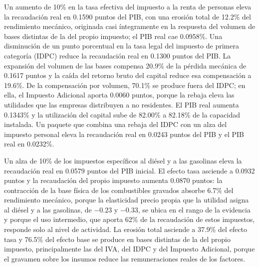 \documentclass[11pt]{article}
\begin{document}
Un aumento de 10\% en la tasa efectiva del impuesto a la renta de personas eleva la recaudación real en 0.1590 puntos del PIB, con una erosión total de 12.2\% del rendimiento mecánico, originada casi íntegramente en la respuesta del volumen de bases distintas de la del propio impuesto; el PIB real cae 0.0958\%. Una disminución de un punto porcentual en la tasa legal del impuesto de primera categoría (IDPC) reduce la recaudación real en 0.1300 puntos del PIB. La expansión del volumen de las bases compensa 20.9\% de la pérdida mecánica de 0.1617 puntos y la caída del retorno bruto del capital reduce esa compensación a 19.6\%. De la compensación por volumen, 70.1\% se produce fuera del IDPC; en ella, el Impuesto Adicional aporta 0.0060 puntos, porque la rebaja eleva las utilidades que las empresas distribuyen a no residentes. El PIB real aumenta 0.1343\% y la utilización del capital sube de 82.00\% a 82.18\% de la capacidad instalada. Un paquete que combina una rebaja del IDPC con un alza del impuesto personal eleva la recaudación real en 0.0243 puntos del PIB y el PIB real en 0.0232\%.

Un alza de 10\% de los impuestos específicos al diésel y a las gasolinas eleva la recaudación real en 0.0579 puntos del PIB inicial. El efecto tasa asciende a 0.0932 puntos y la recaudación del propio impuesto aumenta 0.0870 puntos: la contracción de la base física de los combustibles gravados absorbe 6.7\% del rendimiento mecánico, porque la elasticidad precio propia que la utilidad asigna al diésel y a las gasolinas, de $-0.23$ y $-0.33$, se ubica en el rango de la evidencia y porque el uso intermedio, que aporta 62\% de la recaudación de estos impuestos, responde solo al nivel de actividad. La erosión total asciende a 37.9\% del efecto tasa y 76.5\% del efecto base se produce en bases distintas de la del propio impuesto, principalmente las del IVA, del IDPC y del Impuesto Adicional, porque el gravamen sobre los insumos reduce las remuneraciones reales de los factores.
\end{document}
